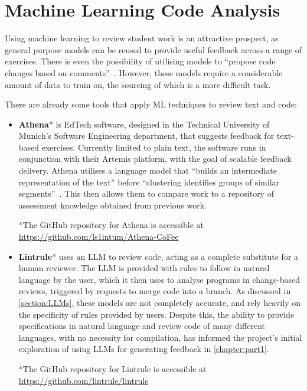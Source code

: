 \section{Machine Learning Code Analysis}

Using machine learning to review student work is an attractive prospect, as general purpose models can be reused to provide useful feedback across a range of exercises. There is even the possibility of utilising models to ``propose code changes based on comments''~\cite{ResolveCommentsWithML}. However, these models require a considerable amount of data to train on, the sourcing of which is a more difficult task. 

There are already some tools that apply ML techniques to review text and code:

\begin{itemize}
    \item \textbf{Athena}* is EdTech software, designed in the Technical University of Munich's Software Engineering department, that suggests feedback for text-based exercises. Currently limited to plain text, the software runs in conjunction with their Artemis platform, with the goal of scalable feedback delivery. Athena utilises a language model that ``builds an intermediate representation of the text'' before ``clustering identifies groups of similar segments''~\cite{Athena}. This then allows them to compare work to a repository of assessment knowledge obtained from previous work.

    \footnotesize
    *The GitHub repository for Athena is accessible at \url{https://github.com/ls1intum/Athena-CoFee}
    \normalsize 
 
    \item \textbf{Lintrule}* uses an LLM to review code, acting as a complete substitute for a human reviewer. The LLM is provided with rules to follow in natural language by the user, which it then uses to analyse programs in change-based reviews, triggered by requests to merge code into a branch. As discussed in \cref{section:LLMs}, these models are not completely accurate, and rely heavily on the specificity of rules provided by users. Despite this, the ability to provide specifications in natural language and review code of many different languages, with no necessity for compilation, has informed the project's initial exploration of using LLMs for generating feedback in \cref{chapter:part1}.
    
    \footnotesize
    *The GitHub repository for Lintrule is accessible at \url{https://github.com/lintrule/lintrule}
    \normalsize

\end{itemize}
